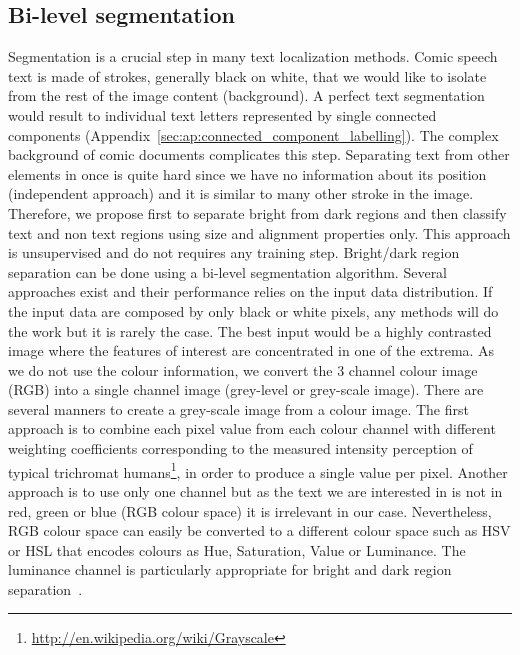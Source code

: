 

\subsection{Bi-level segmentation}
\label{sec:in:segmentation}
Segmentation is a crucial step in many text localization methods.
Comic speech text is made of strokes, generally black on white, that we would like to isolate from the rest of the image content (background).
A perfect text segmentation would result to individual text letters represented by single connected components (Appendix~\ref{sec:ap:connected_component_labelling}).
The complex background of comic documents complicates this step.
Separating text from other elements in once is quite hard since we have no information about its position (independent approach) and it is similar to many other stroke in the image.
Therefore, we propose first to separate bright from dark regions and then classify text and non text regions using size and alignment properties only.
This approach is unsupervised and do not requires any training step.
Bright/dark region separation can be done using a bi-level segmentation algorithm.
Several approaches exist and their performance relies on the input data distribution.
If the input data are composed by only black or white pixels, any methods will do the work but it is rarely the case.
The best input would be a highly contrasted image where the features of interest are concentrated in one of the extrema.
As we do not use the colour information, we convert the 3 channel colour image (RGB) into a single channel image (grey-level or grey-scale image).
There are several manners to create a grey-scale image from a colour image.
The first approach is to combine each pixel value from each colour channel with different weighting coefficients corresponding to the measured intensity perception of typical trichromat humans\footnote{\url{http://en.wikipedia.org/wiki/Grayscale}}, in order to produce a single value per pixel.
Another approach is to use only one channel but as the text we are interested in is not in red, green or blue (RGB colour space) it is irrelevant in our case.
Nevertheless, RGB colour space can easily be converted to a different colour space such as HSV or HSL that encodes colours as Hue, Saturation, Value or Luminance.
The luminance channel is particularly appropriate for bright and dark region separation~\cite{Ho2012}.


